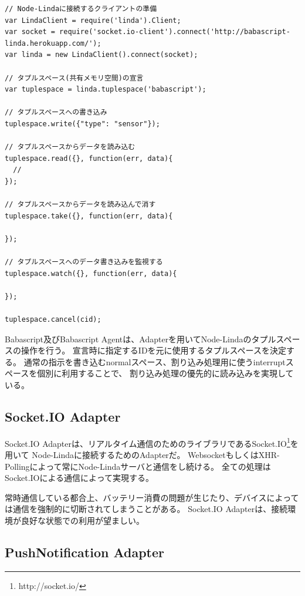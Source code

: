 \begin{lstlisting}[caption=Node-Lindaへの接続方法, label=code:linda-usage]
// Node-Lindaに接続するクライアントの準備
var LindaClient = require('linda').Client;
var socket = require('socket.io-client').connect('http://babascript-linda.herokuapp.com/');
var linda = new LindaClient().connect(socket);

// タプルスペース(共有メモリ空間)の宣言
var tuplespace = linda.tuplespace('babascript');

// タプルスペースへの書き込み
tuplespace.write({"type": "sensor"});

// タプルスペースからデータを読み込む
tuplespace.read({}, function(err, data){
  //
});

// タプルスペースからデータを読み込んで消す
tuplespace.take({}, function(err, data){

});

// タプルスペースへのデータ書き込みを監視する
tuplespace.watch({}, function(err, data){

});

tuplespace.cancel(cid);
\end{lstlisting}

Babascript及びBabascript
Agentは、Adapterを用いてNode-Lindaのタプルスペースの操作を行う。
宣言時に指定するIDを元に使用するタプルスペースを決定する。
通常の指示を書き込むnormalスペース、割り込み処理用に使うinterruptスペースを個別に利用することで、
割り込み処理の優先的に読み込みを実現している。

\subsection{Socket.IO Adapter}\label{socket.io-adapter}

Socket.IO
Adapterは、リアルタイム通信のためのライブラリであるSocket.IO\footnote{http://socket.io/}を用いて
Node-Lindaに接続するためのAdapterだ。
WebsocketもしくはXHR-Pollingによって常にNode-Lindaサーバと通信をし続ける。
全ての処理はSocket.IOによる通信によって実現する。

常時通信している都合上、バッテリー消費の問題が生じたり、デバイスによっては通信を強制的に切断されてしまうことがある。
Socket.IO Adapterは、接続環境が良好な状態での利用が望ましい。

\subsection{PushNotification Adapter}\label{pushnotification-adapter}

